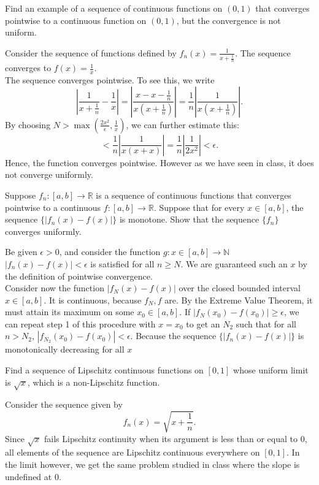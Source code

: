 \documentclass[11 pt]{article}
\begin{document}
\pagebreak
\begin{problem}
	Find an example of a sequence of continuous functions on $(0,1)$ that converges pointwise to a continuous function on $(0,1)$, but the convergence is not uniform.
\end{problem}
\begin{solution}
	Consider the sequence of functions defined by $f_n(x)=\frac{1}{x+\frac{1}{n}}$. The sequence converges to $f(x)=\frac{1}{x}$.\\
	The sequence converges pointwise. To see this, we write \[
	|\frac{1}{x+\frac{1}{n}}-\frac{1}{x}|=|\frac{x-x-\frac{1}{n}}{x(x+\frac{1}{n})}|=\frac{1}{n}|\frac{1}{x(x+\frac{1}{n})}|
	.\] 
	By choosing $N>\max(\frac{2x^{2}}{\epsilon},\frac{1}{x})$, we can further estimate this:
	\[
	<\frac{1}{n}|\frac{1}{x(x+x)}|=\frac{1}{n}|\frac{1}{2x^2}|<\epsilon
	.\] 
	Hence, the function converges pointwise. However as we have seen in class, it does not converge uniformly.
\end{solution}
\pagebreak
\begin{problem}
	Suppose $f_n:[a,b]\to\mathbb{R}$ is a sequence of continuous functions that converges pointwise to a continuous $f:[a,b]\to\mathbb{R}$. Suppose that for every $x\in[a,b]$, the sequence  $\{|f_n(x)-f(x)|\}$ is monotone. Show that the sequence $\{f_n\}$ converges uniformly.
\end{problem}
\begin{solution}
	Be given $\epsilon>0$, and consider the function $g:x\in[a,b]\to\mathbb{N}$ $|f_n(x)-f(x)|<\epsilon$ is satisfied for all $n\geq N$. We are guaranteed such an  $x$ by the definition of pointwise convergence.\\
	Consider now the function $|f_N(x)-f(x)|$ over the closed bounded interval $x\in[a,b]$. It is continuous, because $f_N, f$ are. By the Extreme Value Theorem, it must attain its maximum on some $x_0\in[a,b]$. If $|f_N(x_0)-f(x_0)|\geq\epsilon$, we can repeat step 1 of this procedure with $x=x_0$ to get an  $N_2$ such that for all  $n>N_2$,  $|f_{N_2}(x_0)-f(x_0)|<\epsilon$.
	Because the sequence $\{|f_n(x)-f(x)|\}$ is monotonically decreasing for all $x$
\end{solution}
\pagebreak
\begin{problem}
	Find a sequence of Lipschitz continuous functions on $[0,1]$ whose uniform limit is  $\sqrt{x}$, which is a non-Lipschitz function.
\end{problem}
\begin{solution}
	Consider the sequence given by
	\[
	f_n(x) = \sqrt{x+\frac{1}{n}}
.\]
Since $\sqrt{x}$ fails Lipschitz continuity when its argument is less than or equal to 0, all elements of the sequence are Lipschitz continuous everywhere on $[0,1]$. In the limit however, we get the same problem studied in class where the slope is undefined at 0.
\end{solution}
\end{document}
